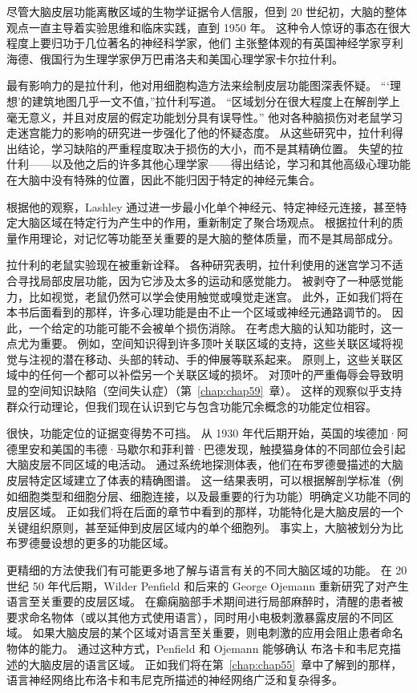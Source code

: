 尽管大脑皮层功能离散区域的生物学证据令人信服，但到 20 世纪初，大脑的整体观点一直主导着实验思维和临床实践，直到 1950 年。
这种令人惊讶的事态在很大程度上要归功于几位著名的神经科学家，他们 主张整体观的有英国神经学家亨利海德、俄国行为生理学家伊万巴甫洛夫和美国心理学家卡尔拉什利。


最有影响力的是拉什利，他对用细胞构造方法来绘制皮层功能图深表怀疑。
“‘理想’的建筑地图几乎一文不值，”拉什利写道。 “区域划分在很大程度上在解剖学上毫无意义，并且对皮层的假定功能划分具有误导性。” 
他对各种脑损伤对老鼠学习走迷宫能力的影响的研究进一步强化了他的怀疑态度。
从这些研究中，拉什利得出结论，学习缺陷的严重程度取决于损伤的大小，而不是其精确位置。
失望的拉什利——以及他之后的许多其他心理学家——得出结论，学习和其他高级心理功能在大脑中没有特殊的位置，因此不能归因于特定的神经元集合。


根据他的观察，Lashley 通过进一步最小化单个神经元、特定神经元连接，甚至特定大脑区域在特定行为产生中的作用，重新制定了聚合场观点。
根据拉什利的质量作用理论，对记忆等功能至关重要的是大脑的整体质量，而不是其局部成分。


拉什利的老鼠实验现在被重新诠释。
各种研究表明，拉什利使用的迷宫学习不适合寻找局部皮层功能，因为它涉及太多的运动和感觉能力。
被剥夺了一种感觉能力，比如视觉，老鼠仍然可以学会使用触觉或嗅觉走迷宫。
此外，正如我们将在本书后面看到的那样，许多心理功能是由不止一个区域或神经元通路调节的。
因此，一个给定的功能可能不会被单个损伤消除。
在考虑大脑的认知功能时，这一点尤为重要。
例如，空间知识得到许多顶叶关联区域的支持，这些关联区域将视觉与注视的潜在移动、头部的转动、手的伸展等联系起来。
原则上，这些关联区域中的任何一个都可以补偿另一个关联区域的损坏。
对顶叶的严重侮辱会导致明显的空间知识缺陷（空间失认症）（第~\ref{chap:chap59}~章）。
这样的观察似乎支持群众行动理论，但我们现在认识到它与包含功能冗余概念的功能定位相容。


很快，功能定位的证据变得势不可挡。
从 1930 年代后期开始，英国的埃德加·阿德里安和美国的韦德·马歇尔和菲利普·巴德发现，触摸猫身体的不同部位会引起大脑皮层不同区域的电活动。
通过系统地探测体表，他们在布罗德曼描述的大脑皮层特定区域建立了体表的精确图谱。
这一结果表明，可以根据解剖学标准（例如细胞类型和细胞分层、细胞连接，以及最重要的行为功能）明确定义功能不同的皮层区域。
正如我们将在后面的章节中看到的那样，功能特化是大脑皮层的一个关键组织原则，甚至延伸到皮层区域内的单个细胞列。
事实上，大脑被划分为比布罗德曼设想的更多的功能区域。


更精细的方法使我们有可能更多地了解与语言有关的不同大脑区域的功能。
在 20 世纪 50 年代后期，Wilder Penfield 和后来的 George Ojemann 重新研究了对产生语言至关重要的皮层区域。
在癫痫脑部手术期间进行局部麻醉时，清醒的患者被要求命名物体（或以其他方式使用语言），同时用小电极刺激暴露皮层的不同区域。
如果大脑皮层的某个区域对语言至关重要，则电刺激的应用会阻止患者命名物体的能力。
通过这种方式，Penfield 和 Ojemann 能够确认 布洛卡和韦尼克描述的大脑皮层的语言区域。
正如我们将在第~\ref{chap:chap55}~章中了解到的那样，语言神经网络比布洛卡和韦尼克所描述的神经网络广泛和复杂得多。



